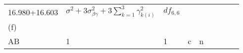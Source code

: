 \documentclass[12pt,]{article}
\begin{document}
\begin{longtable}[]{@{}lllllllll@{}}
\begin{minipage}[t]{0.15\columnwidth}
16.980+16.603\strut
\end{minipage} & \begin{minipage}[t]{0.21\columnwidth}\raggedright
\(\sigma^2+3\sigma^2_{\beta\gamma}+3\sum\limits_{k=1}^3\gamma_{k(i)}^2\)\strut
\end{minipage} & \begin{minipage}[t]{0.09\columnwidth}\raggedright
\(df_{6,6}\)\strut
\end{minipage}\tabularnewline
\begin{minipage}[t]{0.06\columnwidth}\raggedright
(f)\strut
\end{minipage} & \begin{minipage}[t]{0.03\columnwidth}\raggedright
\strut
\end{minipage} & \begin{minipage}[t]{0.03\columnwidth}\raggedright
\strut
\end{minipage} & \begin{minipage}[t]{0.03\columnwidth}\raggedright
\strut
\end{minipage} & \begin{minipage}[t]{0.03\columnwidth}\raggedright
\strut
\end{minipage} & \begin{minipage}[t]{0.12\columnwidth}\raggedright
\strut
\end{minipage} & \begin{minipage}[t]{0.15\columnwidth}\raggedright
\strut
\end{minipage} & \begin{minipage}[t]{0.21\columnwidth}\raggedright
\strut
\end{minipage} & \begin{minipage}[t]{0.09\columnwidth}\raggedright
\strut
\end{minipage}\tabularnewline
\begin{minipage}[t]{0.06\columnwidth}\raggedright
AB\strut
\end{minipage} & \begin{minipage}[t]{0.03\columnwidth}\raggedright
1\strut
\end{minipage} & \begin{minipage}[t]{0.03\columnwidth}\raggedright
1\strut
\end{minipage} & \begin{minipage}[t]{0.03\columnwidth}\raggedright
c\strut
\end{minipage} & \begin{minipage}[t]{0.03\columnwidth}\raggedright
n\strut

\end{minipage}
\end{longtable}
\end{document}

